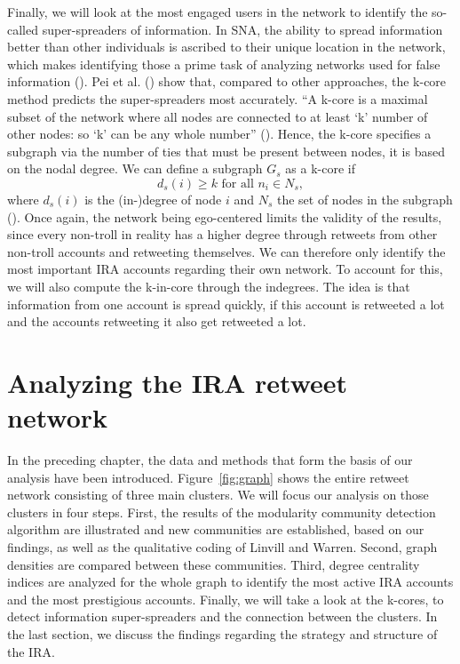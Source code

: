 \documentclass[12pt, titlepage=true, toc=bib]{scrartcl}
\begin{document}
Finally, we will look at the most engaged users in the network to identify the so-called super-spreaders of information. In SNA, the ability to spread information better than other individuals is ascribed to their unique location in the network, which makes identifying those a prime task of analyzing networks used for false information (\cite[1]{pei_searching_2015}). Pei et al. (\cite*{pei_searching_2015}) show that, compared to other approaches, the k-core method predicts the super-spreaders most accurately. \enquote{A k-core is a maximal subset of the network where all nodes are connected to at least \enquote{k} number of other nodes: so \enquote{k} can be any whole number} (\cite[983]{golovchenko_state_2018}). Hence, the k-core specifies a subgraph via the number of ties that must be present between nodes, it is based on the nodal degree. We can define a subgraph \( G_{s} \) as a k-core if \[ d_{s}(i) \geq k \text{ for all } n_{i} \in N_{s} ,\] where \( d_{s}(i) \) is the (in-)degree of node \( i \) and \( N_{s} \) the set of nodes in the subgraph (\cite[266]{wasserman_social_1994}). Once again, the network being ego-centered limits the validity of the results, since every non-troll in reality has a higher degree through retweets from other non-troll accounts and retweeting themselves. We can therefore only identify the most important IRA accounts regarding their own network. To account for this, we will also compute the k-in-core through the indegrees. The idea is that information from one account is spread quickly, if this account is retweeted a lot and the accounts retweeting it also get retweeted a lot.


\section{Analyzing the IRA retweet network}

In the preceding chapter, the data and methods that form the basis of our analysis have been introduced. Figure~\ref{fig:graph} shows the entire retweet network consisting of three main clusters. We will focus our analysis on those clusters in four steps. First, the results of the modularity community detection algorithm are illustrated and new communities are established, based on our findings, as well as the qualitative coding of Linvill and Warren. Second, graph densities are compared between these communities. Third, degree centrality indices are analyzed for the whole graph to identify the most active IRA accounts and the most prestigious accounts. Finally, we will take a look at the k-cores, to detect information super-spreaders and the connection between the clusters. In the last section, we discuss the findings regarding the strategy and structure of the IRA.
\end{document}
